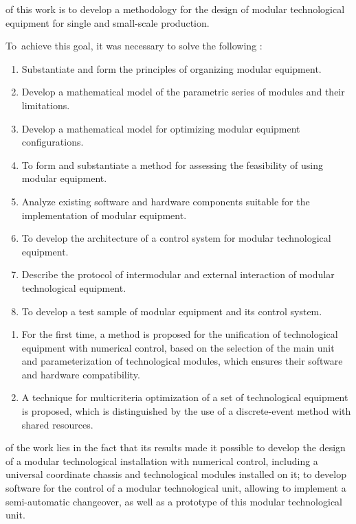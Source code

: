 
{\aimEn} of this work is to develop a methodology for the design of modular technological equipment for single and small-scale production.

To~achieve this goal, it was necessary to solve the following {\tasksEn}:
\begin{enumerate}[beginpenalty=10000] %
	\item Substantiate and form the principles of organizing modular equipment.
	\item Develop a mathematical model of the parametric series of modules and their limitations.
	\item Develop a mathematical model for optimizing modular equipment configurations.
	\item To form and substantiate a method for assessing the feasibility of using modular equipment.
	\item Analyze existing software and hardware components suitable for the implementation of modular equipment.
	\item To develop the architecture of a control system for modular technological equipment.
	\item Describe the protocol of intermodular and external interaction of modular technological equipment.
	\item To develop a test sample of modular equipment and its control system.
\end{enumerate}


{\noveltyEn}
\begin{enumerate}[beginpenalty=10000] %
  \item For the first time, a method is proposed for the unification of technological equipment with numerical control, based on the selection of the main unit and parameterization of technological modules, which ensures their software and hardware compatibility.
  \item A technique for multicriteria optimization of a set of technological equipment is proposed, which is distinguished by the use of a discrete-event method with shared resources.
\end{enumerate}

{\influenceEn} of the work lies in the fact that its results made it possible to develop the design of a modular technological installation with numerical control, including a universal coordinate chassis and technological modules installed on it; to develop software for the control of a modular technological unit, allowing to implement a semi-automatic changeover, as well as a prototype of this modular technological unit.

